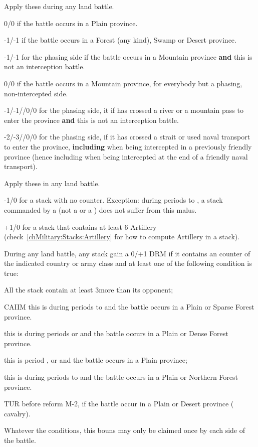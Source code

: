  Apply these during any land battle.
\begin{modlist}
\item[0/0] if the battle occurs in a Plain province.
\item[-1/-1] if the battle occurs in a Forest (any kind), Swamp or
  Desert province.
\item[-1/-1] for the phasing side if the battle occurs in a Mountain
  province \textbf{and} this is not an interception battle.
\item[0/0] if the battle occurs in a Mountain province, for everybody but
  a phasing, non-intercepted side.
\item[-1/-1//0/0] for the phasing side, it if has crossed a river or a
  mountain pass to enter the province \textbf{and} this is not an interception
  battle.
\item[-2/-3//0/0] for the phasing side, if it has crossed a strait or used
  naval transport to enter the province, \textbf{including} when being
  intercepted in a previously friendly province (hence including when being
  intercepted at the end of a friendly naval transport).
\end{modlist}

 Apply these in any land battle.
\begin{modlist}
\item[-1/0] for a stack with no \ARMY counter. Exception: during periods
   to , a stack commanded by a \LeaderC (not a \LeaderGov
  or a \LeaderE) does not suffer from this malus.
\item[+1/0] for a stack that contains at least 6 Artillery
  (check~\ref{chMilitary:Stacks:Artillery} for how to compute Artillery in a
  stack).
\end{modlist}

 During any land battle, any stack gain a 0/+1 DRM
if it contains an \ARMY counter of the indicated country or army class and at
least one of the following condition is true:
\begin{modlist}
\item[All] the stack contain at least 3\LD more than its opponent;
\item[CAIIM] this is during periods  to  and the battle
  occurs in a Plain or Sparse Forest province.
\item[\CAIIIM] this is during periods  or  and the battle
  occurs in a Plain or Dense Forest province.
\item[\CAIV] this is period ,  or  and the
  battle occurs in a Plain province;
\item[\SUE] this is during periods  to  and the battle
  occurs in a Plain or Northern Forest province.
\item[TUR] before reform M-2, if the battle occur in a Plain or Desert
  province ( cavalry).
\end{modlist}
Whatever the conditions, this bouns may only be claimed once by each side of
the battle.

